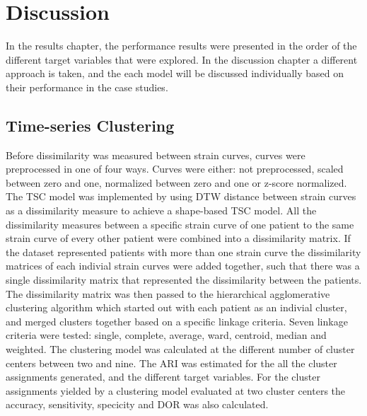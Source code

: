\chapter{Discussion} \label{chap:discussion}

In the results chapter, the performance results were presented in the order of the different target variables that were explored. 
In the discussion chapter a different approach is taken, and the each model will be discussed individually based on their performance in the case studies.

\section{Time-series Clustering} \label{sec:disc_tsc}

Before dissimilarity was measured between strain curves, curves were preprocessed in one of four ways. 
Curves were either: not preprocessed, scaled between zero and one, normalized between zero and one or z-score normalized.
The TSC model was implemented by using DTW distance between strain curves as a dissimilarity measure to achieve a shape-based TSC model.
All the dissimilarity measures between a specific strain curve of one patient to the same strain curve of every other patient were combined into a dissimilarity matrix.
If the dataset represented patients with more than one strain curve the dissimilarity matrices of each indivial strain curves were added together, such that there was a single dissimilarity matrix that represented the dissimilarity between the patients.
The dissimilarity matrix was then passed to the hierarchical agglomerative clustering algorithm which started out with each patient as an indivial cluster, and merged clusters together based on a specific linkage criteria.
Seven linkage criteria were tested: single, complete, average, ward, centroid, median and weighted.
The clustering model was calculated at the different number of cluster centers between two and nine.
The ARI was estimated for the all the cluster assignments generated, and the different target variables.
For the cluster assignments yielded by a clustering model evaluated at two cluster centers the accuracy, sensitivity, specicity and DOR was also calculated. \bigskip

